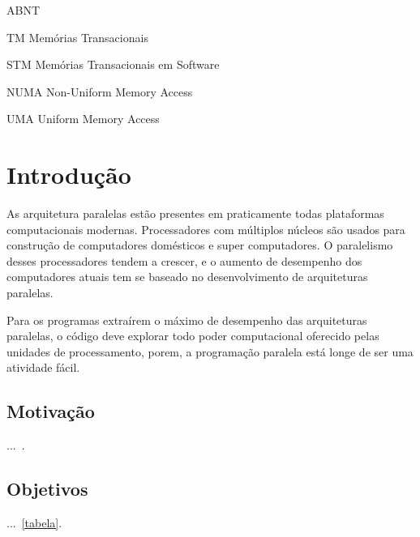 \documentclass[diss,capa]{texufpel}
\begin{document}
\listoffigures

\listoftables

\begin{listofabbrv}{ABNT}%
        \item[TM] Memórias Transacionais
        \item[STM] Memórias Transacionais em Software
        \item[NUMA] Non-Uniform Memory Access
        \item[UMA] Uniform Memory Access
\end{listofabbrv}

\tableofcontents

\chapter{Introdução}

As arquitetura paralelas estão presentes em praticamente todas plataformas computacionais modernas. Processadores com múltiplos núcleos são usados para construção de computadores domésticos e super computadores. O paralelismo desses processadores tendem a crescer, e o aumento de desempenho dos computadores atuais tem se baseado no desenvolvimento de arquiteturas paralelas.

Para os programas extraírem o máximo de desempenho das arquiteturas paralelas, o código deve explorar todo poder computacional oferecido pelas unidades de processamento, porem, a programação paralela está longe de ser uma atividade fácil. 

\section{Motivação}
...~\cite{vonNeumann:1966:TSR}.

\section{Objetivos}

...~\ref{tabela}.
\end{document}

